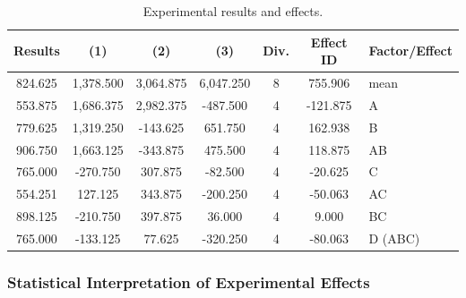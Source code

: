 \documentclass[12pt,a4paper]{article}
\begin{document}
	\begin{table}[htbp]
		\centering
		\begin{tabular}{cccccc|l}
			\toprule
			\textbf{Results} & \textbf{(1)} & \textbf{(2)} & \textbf{(3)} & \textbf{Div.} & \textbf{Effect ID} & \textbf{Factor/Effect} \\
			\midrule
			824.625 & 1,378.500 & 3,064.875 & 6,047.250 & 8 & 755.906 & mean \\
			553.875 & 1,686.375 & 2,982.375 & -487.500  & 4 & -121.875  &  A \\
			779.625 & 1,319.250 & -143.625  & 651.750   & 4 & 162.938  &  B \\
			906.750 & 1,663.125 & -343.875  & 475.500   & 4 & 118.875   & AB \\
			765.000 & -270.750  & 307.875   & -82.500   & 4 & -20.625   & C \\
			554.251 & 127.125   & 343.875   & -200.250  & 4 & -50.063  & AC \\
			898.125 & -210.750  & 397.875   & 36.000    & 4 & 9.000     & BC \\
			765.000 & -133.125  & 77.625    & -320.250  & 4 & -80.063  & D (ABC) \\
			\bottomrule
		\end{tabular}
		\caption{Experimental results and effects.}
		\label{tab:effects}
	\end{table}
	\FloatBarrier
	
	\subsubsection*{Statistical Interpretation of Experimental Effects}
	
%	
	
\end{document}
